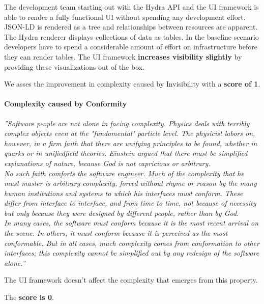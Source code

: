 The development team starting out with the Hydra API and the UI framework is able to render a fully functional UI without spending any development effort. JSON-LD is rendered as a tree and relationships between resources are apparent. The Hydra renderer displays collections of data as tables. In the baseline scenario developers have to spend a considerable amount of effort on infrastructure before they can render tables. The UI framework \textbf{increases visibility slightly} by providing these visualizations out of the box.

We asses the improvement in complexity caused by Invisibility with a \textbf{score of 1}.

\paragraph{Complexity caused by Conformity}
\textit{''Software people are not alone in facing complexity. Physics deals with terribly complex objects even at the "fundamental" particle level. The physicist labors on, however, in a firm faith that there are unifying principles to be found, whether in quarks or in unifiedfield theories. Einstein argued that there must be simplified explanations of nature, because God is not capricious or arbitrary. \\ No such faith comforts the software engineer. Much of the complexity that he must master is arbitrary complexity, forced without rhyme or reason by the many human institutions and systems to which his interfaces must conform. These differ from interface to interface, and from time to time, not because of necessity but only because they were designed by different people, rather than by God. \\ In many cases, the software must conform because it is the most recent arrival on the scene. In others, it must conform because it is perceived as the most conformable. But in all cases, much complexity comes from conformation to other interfaces; this complexity cannot be simplified out by any redesign of the software alone.''} \citep[p.~3]{nosilverbullet}

The UI framework doesn't affect the complexity that emerges from this property.

The \textbf{score is 0}.

